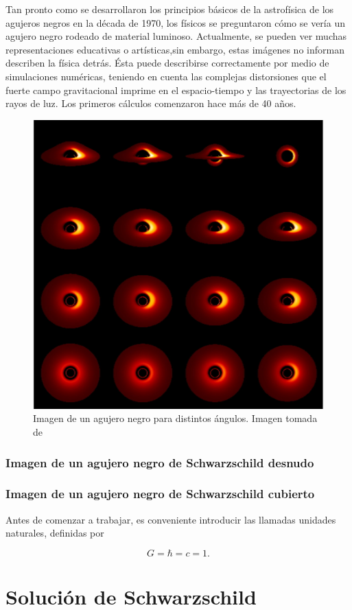 \documentclass[11pt]{article}
\begin{document}
Tan pronto como se desarrollaron los principios básicos de la astrofísica de los agujeros negros en la década de 1970, los físicos se preguntaron cómo se vería un agujero negro rodeado de material luminoso. Actualmente, se pueden ver muchas representaciones educativas o artísticas,sin embargo, estas imágenes no informan describen la física detrás. Ésta puede describirse correctamente por medio de simulaciones numéricas, teniendo en cuenta las complejas distorsiones que el fuerte campo gravitacional imprime en el espacio-tiempo y las trayectorias de los rayos de luz. Los primeros cálculos comenzaron hace más de 40 años. 


\begin{figure}[H]
	\centering
	\includegraphics[width=0.5\linewidth]{Images/marck_1989}
	\caption{Imagen de un agujero negro para distintos ángulos. Imagen tomada de \cite{Luminet_blog}}
	\label{fig:marck1989}
\end{figure}

\subsubsection{Imagen de un agujero negro de Schwarzschild desnudo}

\subsubsection{Imagen de un agujero negro de Schwarzschild cubierto}

Antes de comenzar a trabajar, es conveniente introducir las llamadas unidades naturales, definidas por

\begin{equation}
G = \hbar = c = 1.
\label{ec:unidades naturales}
\end{equation}


\section{Solución de Schwarzschild}
\end{document}
